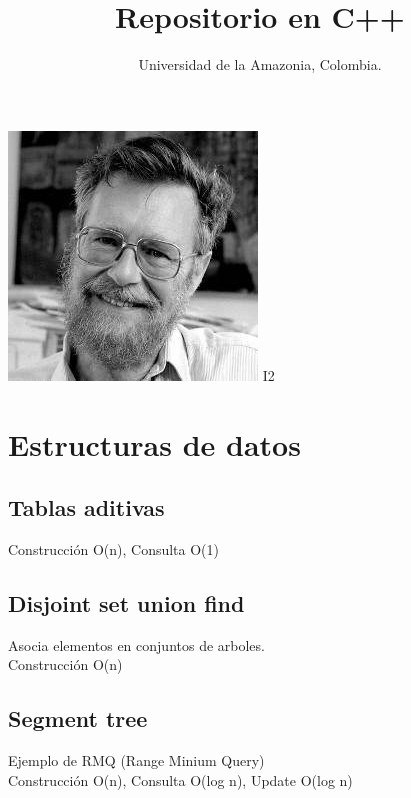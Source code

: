 \documentclass[10pt,landscape,twocolumn,letterpaper,twosided]{article}
\newcommand\cppfile[2][]{

}
\begin{document}
	
	\title{Repositorio en C++}
	\author{Universidad de la Amazonia, Colombia.}
	\maketitle
	
	\begin{center}
		\includegraphics[scale=0.9]{dijkstra}
		\Huge{I2}
	\end{center}
	\normalsize
	\tableofcontents
	\hfill
	
		\section{Estructuras de datos}
			\subsection{Tablas aditivas}
			Construcción O(n), Consulta O(1)
			\cppfile[16-33]{estructuras_de_datos/tablas_aditivas.cpp}
			\subsection{Disjoint set union find}
			Asocia elementos en conjuntos de arboles.\\
			Construcción O(n)
			\cppfile[7-44]{estructuras_de_datos/disjoint_set_union_find.cpp}
			\subsection{Segment tree}
			Ejemplo de RMQ (Range Minium Query)\\
			Construcción O(n), Consulta O(log n), Update O(log n)
			\cppfile[8-68]{estructuras_de_datos/segment_tree.cpp}%
\end{document}
